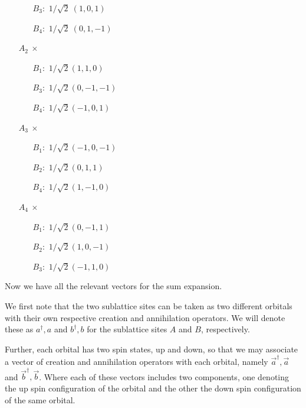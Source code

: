 \documentclass[10pt,a4paper]{article}
\begin{document}
\begin{multicols}{2}
\begin{center}
\begin{minipage}[c]{0.6\linewidth}
\begin{itemize}
\begin{itemize}
\item[$B_3:$] $1/\sqrt{2}\ (1,0,1)$
\item[$B_4:$] $1/\sqrt{2}\ (0,1,-1)$
\end{itemize}
\item[$A_2\ \times$] \begin{itemize}
\item[$B_1:$] $1/\sqrt{2}(1,1,0)$
\item[$B_3:$] $1/\sqrt{2}(0,-1,-1)$
\item[$B_4:$] $1/\sqrt{2}(-1,0,1)$
\end{itemize}
\item[$A_3\  \times$] \begin{itemize}
\item[$B_1:$] $1/\sqrt{2}(-1,0,-1)$
\item[$B_2:$] $1/\sqrt{2}(0,1,1)$
\item[$B_4:$] $1/\sqrt{2}(1,-1,0)$
\end{itemize}
\item[$A_4\ \times$] \begin{itemize}
\item[$B_1:$]$1/\sqrt{2}(0,-1,1)$
\item[$B_2:$] $1/\sqrt{2}(1,0,-1)$
\item[$B_3:$]$1/\sqrt{2}(-1,1,0)$
\end{itemize}
\end{itemize}
\end{minipage}
\end{center}
Now we have all the relevant vectors for the sum expansion.

We first note that the two sublattice sites can be taken as two different orbitals with their own
respective creation and annihilation operators. We will denote these as $a^{\dagger}, a$ and $b^{\dagger}, b$ 
for the sublattice sites $A$ and $B$, respectively. 

Further, each orbital has two spin states, up and down, so that we may associate a vector of creation and annihilation operators with each orbital, namely $\vec{a}^{\dagger}, \vec{a}$ and $\vec{b}^{\dagger}, \vec{b}$. Where each of these vectors includes two components, one denoting the up spin configuration of the orbital and the other the down spin configuration of the same orbital. 


\end{multicols}
\end{document}
